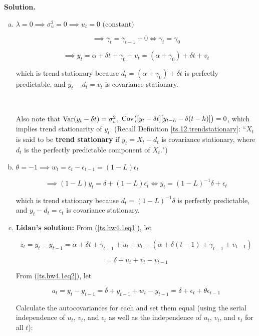 
\textbf{Solution.}

\begin{enumerate}[(a)]

\item \(\lambda = 0 \implies \sigma_u^2 = 0 \implies u_t = 0 \text{ (constant)}\)

\[
\implies \gamma_t = \gamma_{t-1} + 0 \iff \gamma_t = \gamma_0
\]

\[
\implies y_t =  \alpha + \delta t +  \gamma_0  + v_t = ( \alpha +  \gamma_0) + \delta  t + v_t 
\]

which is trend stationary because \(d_t = ( \alpha +  \gamma_0) + \delta t\) is perfectly predictable, and \(y_t - d_t = v_t\) is covariance stationary.

\

Also note that \(\Var(y_t - \delta t) = \sigma_v^2\), \(\Cov\big( [y_t-\delta t][y_{t-h} - \delta(t-h)]\big) = 0\), which implies trend stationarity of \(y_t\). (Recall Definition \ref{ts.12.trendstationary}: ``\(X_t\) is said to be \textbf{trend stationary} if \(y_t = X_t - d_t\) is covariance stationary, where \(d_t\) is the perfectly predictable component of \(X_t\).")

\item 

\(\theta = -1 \implies w_t = \epsilon_t - \epsilon_{t-1} =  (1 - L)\epsilon_t\)

\[
\implies (1 - L)y_t = \delta + (1 - L)\epsilon_t \iff y_t = (1 - L)^{-1}\delta + \epsilon_t
\]

which is trend stationary because \(d_t =  (1 - L)^{-1}\delta\) is perfectly predictable, and \(y_t - d_t = \epsilon_t\) is covariance stationary.

\item 



\textbf{Lidan's solution:} From (\ref{ts.hw4.1eq1}), let 

\[
z_t = y_t - y_{t-1} = \alpha + \delta t + \gamma_{t-1} + u_t + v_t - (\alpha + \delta (t-1) + \gamma_{t-1} + v_{t-1}) 
\]

\[
=  \delta + u_t + v_t - v_{t-1}
\]

From (\ref{ts.hw4.1eq2}), let

\[
a_t = y_t - y_{t-1} = \delta + y_{t-1} + w_t - y_{t-1} =  \delta +  \epsilon_t + \theta \epsilon_{t-1}
\]

Calculate the autocovariances for each and set them equal (using the serial independence of \(u_t\), \(v_t\), and \(\epsilon_t\) as well as the independence of \(u_t\), \(v_t\), and \(\epsilon_t\) for all \(t\)):


\end{enumerate}

